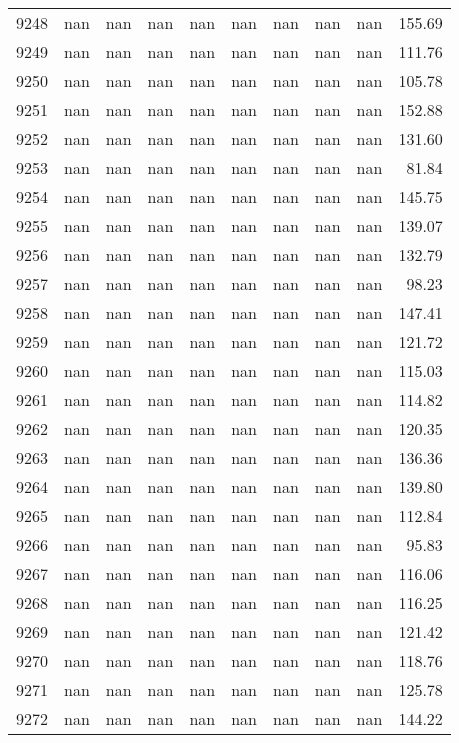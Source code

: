 \begin{tabular}{lrrrrrrrrr}
9248 & nan & nan & nan & nan & nan & nan & nan & nan & 155.69 \\
9249 & nan & nan & nan & nan & nan & nan & nan & nan & 111.76 \\
9250 & nan & nan & nan & nan & nan & nan & nan & nan & 105.78 \\
9251 & nan & nan & nan & nan & nan & nan & nan & nan & 152.88 \\
9252 & nan & nan & nan & nan & nan & nan & nan & nan & 131.60 \\
9253 & nan & nan & nan & nan & nan & nan & nan & nan & 81.84 \\
9254 & nan & nan & nan & nan & nan & nan & nan & nan & 145.75 \\
9255 & nan & nan & nan & nan & nan & nan & nan & nan & 139.07 \\
9256 & nan & nan & nan & nan & nan & nan & nan & nan & 132.79 \\
9257 & nan & nan & nan & nan & nan & nan & nan & nan & 98.23 \\
9258 & nan & nan & nan & nan & nan & nan & nan & nan & 147.41 \\
9259 & nan & nan & nan & nan & nan & nan & nan & nan & 121.72 \\
9260 & nan & nan & nan & nan & nan & nan & nan & nan & 115.03 \\
9261 & nan & nan & nan & nan & nan & nan & nan & nan & 114.82 \\
9262 & nan & nan & nan & nan & nan & nan & nan & nan & 120.35 \\
9263 & nan & nan & nan & nan & nan & nan & nan & nan & 136.36 \\
9264 & nan & nan & nan & nan & nan & nan & nan & nan & 139.80 \\
9265 & nan & nan & nan & nan & nan & nan & nan & nan & 112.84 \\
9266 & nan & nan & nan & nan & nan & nan & nan & nan & 95.83 \\
9267 & nan & nan & nan & nan & nan & nan & nan & nan & 116.06 \\
9268 & nan & nan & nan & nan & nan & nan & nan & nan & 116.25 \\
9269 & nan & nan & nan & nan & nan & nan & nan & nan & 121.42 \\
9270 & nan & nan & nan & nan & nan & nan & nan & nan & 118.76 \\
9271 & nan & nan & nan & nan & nan & nan & nan & nan & 125.78 \\
9272 & nan & nan & nan & nan & nan & nan & nan & nan & 144.22 \\

\end{tabular}
